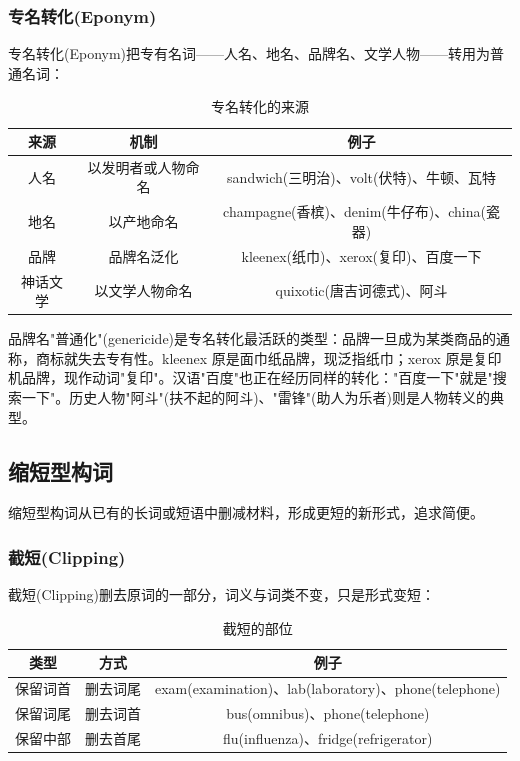 \subsubsection{专名转化(Eponym)}

专名转化(Eponym)把专有名词——人名、地名、品牌名、文学人物——转用为普通名词：

\begin{table}[H]
\centering
\caption{专名转化的来源}
\begin{tabulary}{\textwidth}{@{}CCC@{}}
\toprule
\textbf{来源} & \textbf{机制} & \textbf{例子} \\
\midrule
人名 & 以发明者或人物命名 & sandwich(三明治)、volt(伏特)、牛顿、瓦特 \\
地名 & 以产地命名 & champagne(香槟)、denim(牛仔布)、china(瓷器) \\
品牌 & 品牌名泛化 & kleenex(纸巾)、xerox(复印)、百度一下 \\
神话文学 & 以文学人物命名 & quixotic(唐吉诃德式)、阿斗 \\
\bottomrule
\end{tabulary}
\end{table}

品牌名"普通化"(genericide)是专名转化最活跃的类型：品牌一旦成为某类商品的通称，商标就失去专有性。kleenex 原是面巾纸品牌，现泛指纸巾；xerox 原是复印机品牌，现作动词"复印"。汉语"百度"也正在经历同样的转化："百度一下"就是"搜索一下"。历史人物"阿斗"(扶不起的阿斗)、"雷锋"(助人为乐者)则是人物转义的典型。

\subsection{缩短型构词}

缩短型构词从已有的长词或短语中删减材料，形成更短的新形式，追求简便。

\subsubsection{截短(Clipping)}

截短(Clipping)删去原词的一部分，词义与词类不变，只是形式变短：

\begin{table}[H]
\centering
\caption{截短的部位}
\begin{tabulary}{\textwidth}{@{}CCC@{}}
\toprule
\textbf{类型} & \textbf{方式} & \textbf{例子} \\
\midrule
保留词首 & 删去词尾 & exam(examination)、lab(laboratory)、phone(telephone) \\
保留词尾 & 删去词首 & bus(omnibus)、phone(telephone) \\
保留中部 & 删去首尾 & flu(influenza)、fridge(refrigerator) \\
\bottomrule
\end{tabulary}
\end{table}

